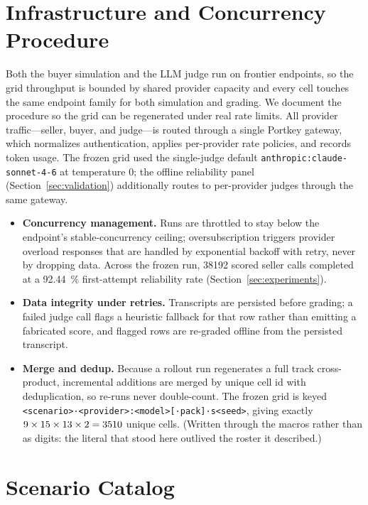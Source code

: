 \section{Infrastructure and Concurrency Procedure}
\label{app:infra}

Both the buyer simulation and the LLM judge run on frontier endpoints, so the grid
throughput is bounded by shared provider capacity and every cell touches the same
endpoint family for both simulation and grading. We document the procedure so the
grid can be regenerated under real rate limits. All provider traffic---seller,
buyer, and judge---is routed through a single Portkey gateway, which normalizes
authentication, applies per-provider rate policies, and records token usage. The
frozen grid used the single-judge default \texttt{anthropic:claude-sonnet-4-6} at
temperature $0$; the offline reliability panel (Section~\ref{sec:validation})
additionally routes to per-provider judges through the same gateway.

\begin{itemize}[leftmargin=1.4em,itemsep=2pt,topsep=2pt]
  \item \textbf{Concurrency management.} Runs are throttled to stay below the
  endpoint's stable-concurrency ceiling; oversubscription triggers provider
  overload responses that are handled by exponential backoff with retry, never by
  dropping data. Across the frozen run, \num{38192} scored seller calls completed
  at a \SI{92.44}{\percent} first-attempt reliability rate (Section~\ref{sec:experiments}).
  \item \textbf{Data integrity under retries.} Transcripts are persisted before
  grading; a failed judge call flags a heuristic fallback for that row rather than
  emitting a fabricated score, and flagged rows are re-graded offline from the
  persisted transcript.
  \item \textbf{Merge and dedup.} Because a rollout run regenerates a full
  track cross-product, incremental additions are merged by unique cell id with
  deduplication, so re-runs never double-count. The frozen grid is keyed
  \texttt{<scenario>·<provider>:<model>[·pack]·s<seed>}, giving exactly
  $9\times15\times13\times2=3510$
  unique cells. (Written through the macros rather than as digits: the literal
  that stood here outlived the roster it described.)
\end{itemize}

\section{Scenario Catalog}
\label{app:scenarios}

